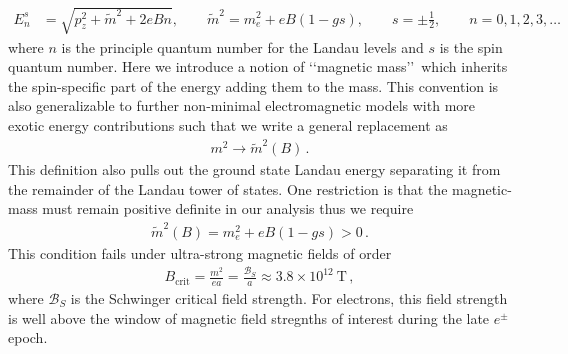 \documentclass[Universe,article,submit,moreauthors,pdftex]{Definitions/mdpi}
\begin{document}
\begin{align}
  \label{KGPEnergy} E_{n}^{s}&=\sqrt{p^2_z+\tilde{m}^2+2eBn},\qquad\tilde{m}^2=m^2_e+eB\left(1-gs\right),\qquad s=\pm\frac{1}{2},\qquad n=0,1,2,3,\dots
\end{align}
where $n$ is the principle quantum number for the Landau levels and $s$ is the spin quantum number. Here we introduce a notion of \lq\lq magnetic mass\rq\rq\ which inherits the spin-specific part of the energy adding them to the mass. This convention is also generalizable to further non-minimal electromagnetic models with more exotic energy contributions such that we write a general replacement as
\begin{align}
  \label{MagMass} m^{2}\rightarrow\tilde{m}^2(B)\,.
\end{align}
This definition also pulls out the ground state Landau energy separating it from the remainder of the Landau tower of states. One restriction is that the magnetic-mass must remain positive definite in our analysis thus we require
\begin{align}
  \label{MassLimit} \tilde{m}^2(B)=m^2_e+eB\left(1-gs\right)>0\,.
\end{align}
This condition fails under ultra-strong magnetic fields of order
\begin{align}
  \label{MagMassFail} B_{\mathrm{crit}}=\frac{m^{2}}{ea}=\frac{\mathcal{B}_{S}}{a}\approx3.8\times10^{12}\ \mathrm{T}\,,
\end{align}
where $\mathcal{B}_{S}$ is the Schwinger critical field strength. For electrons, this field strength is well above the window of magnetic field stregnths of interest during the late $e^{\pm}$ epoch.

\end{document}
